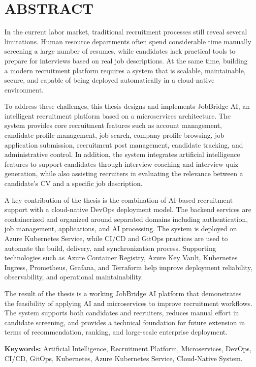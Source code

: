 \documentclass[../DoAn.tex]{subfiles}
\begin{document}
\chapter*{ABSTRACT}

In the current labor market, traditional recruitment processes still reveal several limitations. Human resource departments often spend considerable time manually screening a large number of resumes, while candidates lack practical tools to prepare for interviews based on real job descriptions. At the same time, building a modern recruitment platform requires a system that is scalable, maintainable, secure, and capable of being deployed automatically in a cloud-native environment.

To address these challenges, this thesis designs and implements JobBridge AI, an intelligent recruitment platform based on a microservices architecture. The system provides core recruitment features such as account management, candidate profile management, job search, company profile browsing, job application submission, recruitment post management, candidate tracking, and administrative control. In addition, the system integrates artificial intelligence features to support candidates through interview coaching and interview quiz generation, while also assisting recruiters in evaluating the relevance between a candidate's CV and a specific job description.

A key contribution of the thesis is the combination of AI-based recruitment support with a cloud-native DevOps deployment model. The backend services are containerized and organized around separated domains including authentication, job management, applications, and AI processing. The system is deployed on Azure Kubernetes Service, while CI/CD and GitOps practices are used to automate the build, delivery, and synchronization process. Supporting technologies such as Azure Container Registry, Azure Key Vault, Kubernetes Ingress, Prometheus, Grafana, and Terraform help improve deployment reliability, observability, and operational maintainability.

The result of the thesis is a working JobBridge AI platform that demonstrates the feasibility of applying AI and microservices to improve recruitment workflows. The system supports both candidates and recruiters, reduces manual effort in candidate screening, and provides a technical foundation for future extension in terms of recommendation, ranking, and large-scale enterprise deployment.

\textbf{Keywords:} Artificial Intelligence, Recruitment Platform, Microservices, DevOps, CI/CD, GitOps, Kubernetes, Azure Kubernetes Service, Cloud-Native System.
\end{document}
